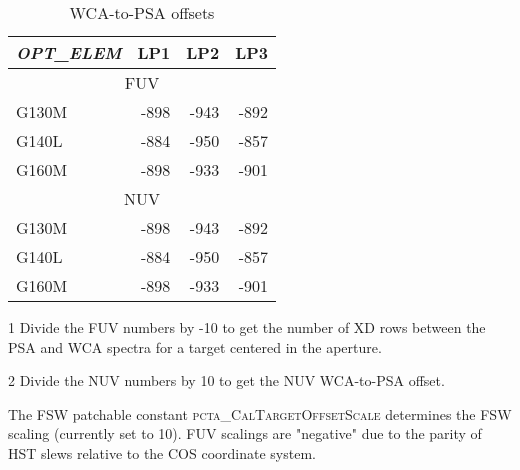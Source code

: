\begin{table}
\centering
	\begin{threeparttable}[tbc]
	\caption{ WCA-to-PSA offsets}
	\begin{tabular*}{.75\linewidth}{@{\extracolsep{\fill}}lrrr}
		\toprule
		\textit{OPT\_ELEM} &	LP1	&	LP2	&	LP3	\\
		\midrule
		\multicolumn{4}{c}{FUV\tnote{1}}\\
		\midrule
		G130M	&	 -898	&	-943	&	-892 \\
		G140L	&	 -884	&	-950	&	-857 \\
		G160M	&	 -898	&	-933	&	-901 \\
		\midrule
		\multicolumn{4}{c}{NUV\tnote{2}}\\
		\midrule
		G130M	&	 -898	&	-943	&	-892 \\
		G140L	&	 -884	&	-950	&	-857 \\
		G160M	&	 -898	&	-933	&	-901 \\
		\bottomrule
	\end{tabular*}
	\footnotesize
		\begin{tablenotes}
			\item[1] {Divide the FUV numbers by -10 to get the number of XD rows between the PSA and WCA spectra for a target centered in the aperture.}
			\item[2] {Divide the NUV numbers by 10 to get the NUV WCA-to-PSA offset. }
		\end{tablenotes}
	The FSW patchable constant \textsc{pcta\_CalTargetOffsetScale} determines the FSW scaling (currently set to 10).
	FUV scalings are "negative" due to the parity of HST slews relative to the COS coordinate system.
	\label{tab:wcatopsa}
	\normalsize
	\end{threeparttable}
\end{table}

